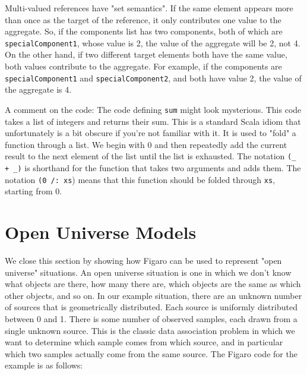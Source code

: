 Multi-valued references have "set semantics". If the same element appears more than once as the target of the reference, it only contributes one value to the aggregate. So, if the components list has two components, both of which are \texttt{specialComponent1}, whose value is 2, the value of the aggregate will be 2, not 4. On the other hand, if two different target elements both have the same value, both values contribute to the aggregate. For example, if the components are \texttt{specialComponent1} and \texttt{specialComponent2}, and both have value 2, the value of the aggregate is 4.

A comment on the code: The code defining \texttt{sum} might look mysterious. This code takes a list of integers and returns their sum. This is a standard Scala idiom that unfortunately is a bit obscure if you're not familiar with it. It is used to "fold" a function through a list. We begin with 0 and then repeatedly add the current result to the next element of the list until the list is exhausted. The notation \texttt{(\_ + \_)} is shorthand for the function that takes two arguments and adds them. The notation \texttt{(0 /: xs}) means that this function should be folded through \texttt{xs}, starting from 0.

\section{Open Universe Models}

We close this section by showing how Figaro can be used to represent "open universe" situations. An open universe situation is one in which we don't know what objects are there, how many there are, which objects are the same as which other objects, and so on. In our example situation, there are an unknown number of sources that is geometrically distributed. Each source is uniformly distributed between 0 and 1. There is some number of observed samples, each drawn from a single unknown source. This is the classic data association problem in which we want to determine which sample comes from which source, and in particular which two samples actually come from the same source. The Figaro code for the example is as follows:

